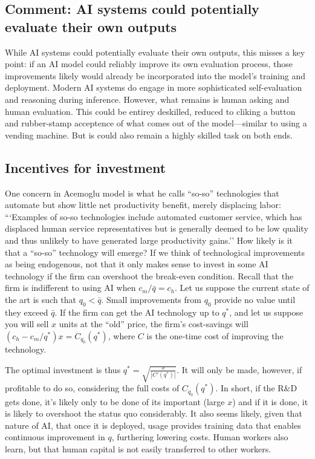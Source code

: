 \documentclass{article}
\begin{document}
\begin{tcolorbox}
\subsection{Comment: AI systems could potentially evaluate their own outputs}
While AI systems could potentially evaluate their own outputs, this misses a key point: if an AI model could reliably improve its own evaluation process, those improvements likely would already be incorporated into the model's training and deployment.
Modern AI systems do engage in more sophisticated self-evaluation and reasoning during inference. 
However, what remains is human asking and human evaluation.
This could be entirey deskilled, reduced to cliking a button and rubber-stamp acceptence of what comes out of the model---similar to using a vending machine.
But is could also remain a highly skilled task on both ends.
\end{tcolorbox}

\subsection{Incentives for investment}
One concern in Acemoglu model is what he calls ``so-so'' technologies that automate but show little net productivity benefit, merely displacing labor: ```Examples of so-so technologies include automated customer service, which has displaced human service representatives but is generally deemed to be low quality and thus unlikely to have generated large productivity gains.''
How likely is it that a ``so-so'' technology will emerge?
If we think of technological improvements as being endogenous, not that it only makes sense to invest in some AI technology if the firm can overshoot the break-even condition. 
Recall that the firm is indifferent to using AI when $c_m / \bar{q} = c_h$. 
Let us suppose the current state of the art is such that $q_0 < \bar{q}$.
Small improvements from $q_0$ provide no value until they exceed $\bar{q}$. 
If the firm can get the AI technology up to $q^*$, and let us suppose you will sell $x$ units at the ``old'' price, 
the firm's cost-savings will $(c_h - c_m / q^*) x = C_{q_0}(q^*)$, where $C$ is the one-time cost of improving the technology.

The optimal investment is thus $q^* = \sqrt{\frac{x}{|C'(q^*)|}}$.
It will only be made, however, if profitable to do so, considering the full costs of $C_{q_0}(q^*)$.
In short, if the R\&D gets done, it's likely only to be done of its important (large $x$) and if it is done, it is likely to overshoot the status quo considerably.  
It also seems likely, given that nature of AI, that once it is deployed, usage provides training data that enables continuous improvement in $q$, furthering lowering costs. 
Human workers also learn, but that human capital is not easily transferred to other workers. 
\end{document}
